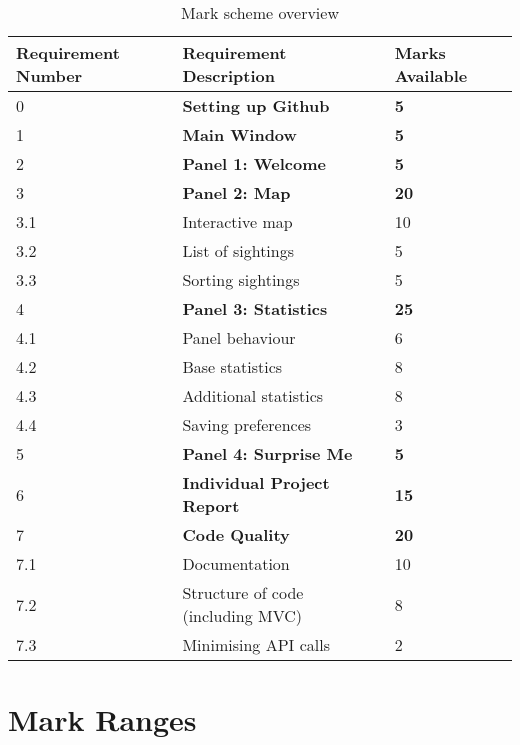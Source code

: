 \documentclass[11pt]{article}
\begin{document}
\begin{table}[h!]

	\begin{center}

		\begin{tabular}{p{4cm}p{6cm}p{3cm}}
			\hline
			Requirement Number & Requirement Description & Marks Available \\
			\hline
			0 & \textbf{Setting up Github} & \textbf{5} \\
			\hline
			\hline
			1 & \textbf{Main Window} & \textbf{5} \\
			\hline
			\hline
			2 & \textbf{Panel 1: Welcome} & \textbf{5} \\
			\hline
			\hline
			3 & \textbf{Panel 2: Map} & \textbf{20} \\
			3.1 & Interactive map & 10 \\
			3.2 & List of sightings & 5 \\
			3.3 & Sorting sightings & 5 \\
			\hline
			\hline
			4 & \textbf{Panel 3: Statistics} & \textbf{25} \\
			4.1 & Panel behaviour & 6 \\
			4.2 & Base statistics & 8 \\
			4.3 & Additional statistics & 8 \\
			4.4 & Saving preferences & 3 \\
			\hline
			\hline
			5 & \textbf{Panel 4: Surprise Me} & \textbf{5} \\
			\hline
			\hline
			6 & \textbf{Individual Project Report} & \textbf{15} \\
			\hline
			\hline
			7 & \textbf{Code Quality} & \textbf{20} \\
			\hline
			7.1 & Documentation & 10 \\
			\hline
			7.2 & Structure of code (including MVC) & 8 \\
			\hline
			7.3 & Minimising API calls & 2 \\
			\hline
			
		\end{tabular}

		\caption{Mark scheme overview}
		\label{table:overview}

	\end{center}

\end{table}%

\section{Mark Ranges}
\end{document}
